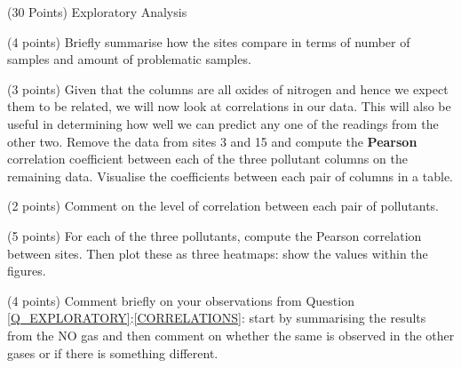 \documentclass[12pt]{article}
\begin{document}
\begin{question}{\label{Q_EXPLORATORY}(30 Points) Exploratory Analysis}
\begin{subquestion}{(4 points) Briefly summarise how the sites compare in terms of number of samples and amount of problematic samples.}



\end{subquestion}

\begin{subquestion}{(3 points) Given that the columns are all oxides of nitrogen and hence we expect them to be related, we will now look at correlations in our data. This will also be useful in determining how well we can predict any one of the readings from the other two. Remove the data from sites 3 and 15 and compute the \textbf{Pearson} correlation coefficient between each of the three pollutant columns on the remaining data. Visualise the coefficients between each pair of columns in a table.}






\end{subquestion}

\begin{subquestion}{(2 points) Comment on the level of correlation between each pair of pollutants.}






\end{subquestion}



\begin{subquestion}{\label{CORRELATIONS}(5 points) For each of the three pollutants, compute the Pearson correlation between sites.  Then plot these as three heatmaps: show the values within the figures. }






\end{subquestion}

\begin{subquestion}{(4 points) Comment briefly on your observations from Question \ref{Q_EXPLORATORY}:\ref{CORRELATIONS}: start by summarising the results from the NO gas and then comment on whether the same is observed in the other gases or if there is something different.}






\end{subquestion}

\end{question}
\end{document}
